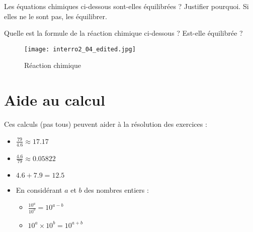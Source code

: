 \documentclass{exam}
\begin{document}
\begin{questions}
\question[1.5] Les équations chimiques ci-dessous sont-elles équilibrées ? Justifier pourquoi. Si elles ne le sont pas, les équilibrer.

\question[0.75] Quelle est la formule de la réaction chimique ci-dessous ? Est-elle équilibrée ?

\begin{figure}[H]
\centering
\texttt{[image: interro2\_04\_edited.jpg]}
\caption{Réaction chimique}
\end{figure} 


\end{questions}

\section*{Aide au calcul}

Ces calculs (pas tous) peuvent aider à la résolution des exercices :
\begin{itemize}
\item $\frac{79}{4.6} \approx 17.17$
\item $\frac{4.6}{79} \approx 0.05822$
\item $4.6 + 7.9 = 12.5$
\item En considérant $a$ et $b$ des nombres entiers : 
\begin{itemize}
  \item $\frac{10^a}{10^b} = 10^{a-b}$
  \item $10^a \times 10^b = 10^{a+b}$ 
\end{itemize}
\end{itemize}
\end{document}
